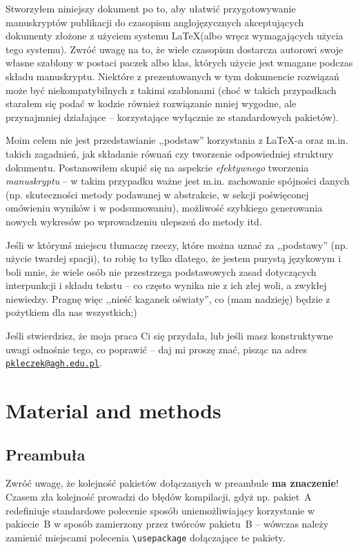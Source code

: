 \documentclass[pdftex,11pt,a4paper]{article}
\begin{document}
Stworzyłem niniejszy dokument po to, aby ułatwić przygotowywanie manuskryptów publikacji do czasopism anglojęzycznych akceptujących dokumenty złożone z użyciem systemu \LaTeX (albo wręcz wymagających użycia tego systemu).
%
Zwróć uwagę na to, że wiele czasopism dostarcza autorowi swoje własne szablony w postaci paczek albo klas, których użycie jest wmagane podczas składu manuskryptu. Niektóre z prezentowanych w tym dokumencie rozwiązań może być niekompatybilnych z takimi szablonami (choć w takich przypadkach starałem się podać w kodzie również rozwiązanie mniej wygodne, ale przynajmniej działające -- korzystające wyłącznie ze standardowych pakietów).

Moim celem nie jest przedstawianie ,,podstaw'' korzystania z \LaTeX-a oraz m.in. takich zagadnień, jak składanie równań czy tworzenie odpowiedniej struktury dokumentu. Postanowiłem skupić się na aspekcie \textit{efektywnego} tworzenia \textit{manuskryptu} -- w takim przypadku ważne jest m.in. zachowanie spójności danych (np. skuteczności metody podawanej w abstrakcie, w sekcji poświęconej omówieniu wyników i w podsumowaniu), możliwość szybkiego generowania nowych wykresów po wprowadzeniu ulepszeń do metody itd.

Jeśli w którymś miejscu tłumaczę rzeczy, które można uznać za ,,podstawy'' (np. użycie twardej spacji), to robię to tylko dlatego, że jestem purystą językowym i boli mnie, że wiele osób nie przestrzega podstawowych zasad dotyczących interpunkcji i składu tekstu -- co często wynika nie z ich złej woli, a zwykłej niewiedzy. Pragnę więc ,,nieść kaganek oświaty'', co (mam nadzieję) będzie z pożytkiem dla nas wszystkich\textellipsis ;)

\par\bigskip

Jeśli stwierdzisz, że moja praca Ci się przydała, lub jeśli masz konstruktywne uwagi odnośnie tego, co poprawić -- daj mi proszę znać, pisząc na adres \href{mailto:pkleczek@agh.edu.pl}{\texttt{pkleczek@agh.edu.pl}}.


\section{Material and methods}

\subsection{Preambuła}
\label{sub:preamble}

Zwróć uwagę, że kolejność pakietów dołączanych w preambule \textbf{ma znaczenie}!
Czasem zła kolejność prowadzi do błędów kompilacji, gdyż np. pakiet~A redefiniuje standardowe polecenie sposób uniemożliwiający korzystanie w pakiecie~B w sposób zamierzony przez twórców pakietu~B -- wówczas należy zamienić miejscami polecenia \lstinline|\usepackage| dołączające te pakiety.
\end{document}
